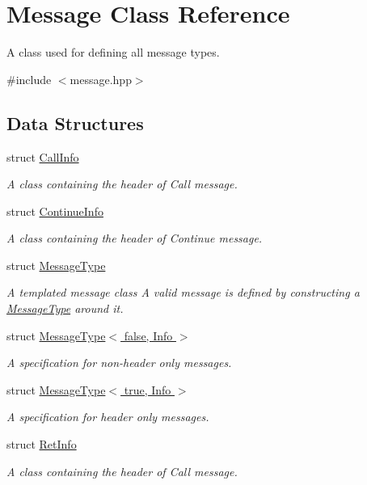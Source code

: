 \hypertarget{class_message}{}\section{Message Class Reference}
\label{class_message}


A class used for defining all message types.  




{\ttfamily \#include $<$message.\+hpp$>$}

\subsection*{Data Structures}
\begin{DoxyCompactItemize}
\item 
struct \hyperlink{struct_message_1_1_call_info}{Call\+Info}
\begin{DoxyCompactList}\small\item\em A class containing the header of Call message. \end{DoxyCompactList}\item 
struct \hyperlink{struct_message_1_1_continue_info}{Continue\+Info}
\begin{DoxyCompactList}\small\item\em A class containing the header of Continue message. \end{DoxyCompactList}\item 
struct \hyperlink{struct_message_1_1_message_type}{Message\+Type}
\begin{DoxyCompactList}\small\item\em A templated message class A valid message is defined by constructing a \hyperlink{struct_message_1_1_message_type}{Message\+Type} around it. \end{DoxyCompactList}\item 
struct \hyperlink{struct_message_1_1_message_type_3_01false_00_01_info_01_4}{Message\+Type$<$ false, Info $>$}
\begin{DoxyCompactList}\small\item\em A specification for non-\/header only messages. \end{DoxyCompactList}\item 
struct \hyperlink{struct_message_1_1_message_type_3_01true_00_01_info_01_4}{Message\+Type$<$ true, Info $>$}
\begin{DoxyCompactList}\small\item\em A specification for header only messages. \end{DoxyCompactList}\item 
struct \hyperlink{struct_message_1_1_ret_info}{Ret\+Info}
\begin{DoxyCompactList}\small\item\em A class containing the header of Call message. \end{DoxyCompactList}\end{DoxyCompactItemize}
